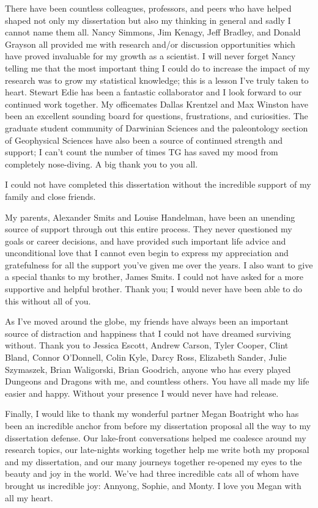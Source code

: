 \documentclass{ucetd}  %
\begin{document}
There have been countless colleagues, professors, and peers who have helped shaped not only my dissertation but also my thinking in general and sadly I cannot name them all. Nancy Simmons, Jim Kenagy, Jeff Bradley, and Donald Grayson all provided me with research and/or discussion opportunities which have proved invaluable for my growth as a scientist. I will never forget Nancy telling me that the most important thing I could do to increase the impact of my research was to grow my statistical knowledge; this is a lesson I've truly taken to heart. Stewart Edie has been a fantastic collaborator and I look forward to our continued work together. My officemates Dallas Krentzel and Max Winston have been an excellent sounding board for questions, frustrations, and curiosities. The graduate student community of Darwinian Sciences and the paleontology section of Geophysical Sciences have also been a source of continued strength and support; I can't count the number of times TG has saved my mood from completely nose-diving. A big thank you to you all.

I could not have completed this dissertation without the incredible support of my family and close friends. 

My parents, Alexander Smits and Louise Handelman, have been an unending source of support through out this entire process. They never questioned my goals or career decisions, and have provided such important life advice and unconditional love that I cannot even begin to express my appreciation and gratefulness for all the support you've given me over the years. I also want to give a special thanks to my brother, James Smits. I could not have asked for a more supportive and helpful brother. Thank you; I would never have been able to do this without all of you.

As I've moved around the globe, my friends have always been an important source of distraction and happiness that I could not have dreamed surviving without. Thank you to Jessica Escott, Andrew Carson, Tyler Cooper, Clint Bland, Connor O'Donnell, Colin Kyle, Darcy Ross, Elizabeth Sander, Julie Szymaszek, Brian Waligorski, Brian Goodrich, anyone who has every played Dungeons and Dragons with me, and countless others. You have all made my life easier and happy. Without your presence I would never have had release.

Finally, I would like to thank my wonderful partner Megan Boatright who has been an incredible anchor from before my dissertation proposal all the way to my dissertation defense. Our lake-front conversations helped me coalesce around my research topics, our late-nights working together help me write both my proposal and my dissertation, and our many journeys together re-opened my eyes to the beauty and joy in the world. We've had three incredible cats all of whom have brought us incredible joy: Annyong, Sophie, and Monty. I love you Megan with all my heart.
\end{document}
